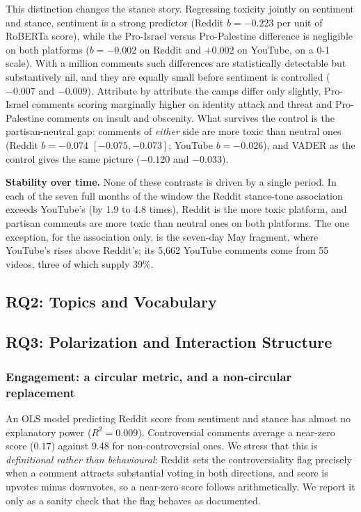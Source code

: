 \documentclass[10pt,twocolumn]{article}
\begin{document}
This distinction changes the stance story. Regressing toxicity jointly on sentiment
and stance, sentiment is a strong predictor (Reddit $b=-0.223$ per unit of RoBERTa
score), while the Pro-Israel versus Pro-Palestine difference is negligible on both
platforms ($b=-0.002$ on Reddit and $+0.002$ on YouTube, on a 0-1 scale). With a
million comments such differences are statistically detectable but substantively
nil, and they are equally small before sentiment is controlled ($-0.007$ and
$-0.009$). Attribute by attribute the camps differ only slightly, Pro-Israel
comments scoring marginally higher on identity attack and threat and Pro-Palestine
comments on insult and obscenity. What survives the control is the partisan-neutral
gap: comments of \emph{either} side are more toxic than neutral ones (Reddit
$b=-0.074$ $[-0.075, -0.073]$; YouTube $b=-0.026$), and VADER as the control gives
the same picture ($-0.120$ and $-0.033$).

\textbf{Stability over time.} None of these contrasts is driven by a single period.
In each of the seven full months of the window the Reddit stance-tone association
exceeds YouTube's (by 1.9 to 4.8 times), Reddit is the more toxic platform, and
partisan comments are more toxic than neutral ones on both platforms. The one
exception, for the association only, is the seven-day May fragment, where YouTube's
rises above Reddit's; its 5{,}662 YouTube comments come from 55 videos, three of
which supply 39\%.

\subsection{RQ2: Topics and Vocabulary}


\subsection{RQ3: Polarization and Interaction Structure}

\subsubsection*{Engagement: a circular metric, and a non-circular replacement}
An OLS model predicting Reddit score from sentiment and stance has almost no
explanatory power ($R^2=0.009$). Controversial comments average a near-zero score
($0.17$) against $9.48$ for non-controversial ones. We stress that this is
\emph{definitional rather than behavioural}: Reddit sets the controversiality flag
precisely when a comment attracts substantial voting in both directions, and score is
upvotes minus downvotes, so a near-zero score follows arithmetically. We report it
only as a sanity check that the flag behaves as documented.
\end{document}
